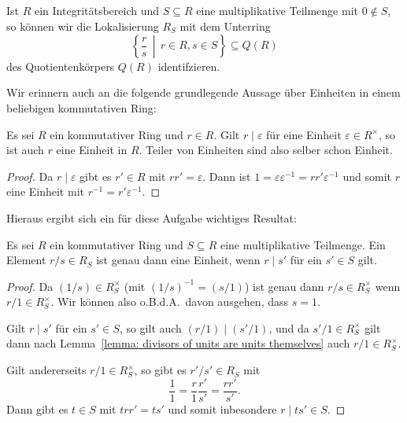 \documentclass[a4paper,10pt,numbers=noenddot]{scrartcl}
\begin{document}
\begin{remark}
  \label{remark: everythin lives in the quotient fields}
  Ist $R$ ein Integritätsbereich und $S \subseteq R$ eine multiplikative Teilmenge mit $0 \notin S$, so können wir die Lokalisierung $R_S$ mit dem Unterring
  \[
    \left\{ \frac{r}{s} \,\middle|\, r \in R, s \in S \right\}
    \subseteq Q(R)
  \]
  des Quotientenkörpers $Q(R)$ identifzieren.
\end{remark}

Wir erinnern auch an die folgende grundlegende Aussage über Einheiten in einem beliebigen kommutativen Ring:

\begin{lemma}
  \label{lemma: divisors of units are units themselves}
  Es sei $R$ ein kommutativer Ring und $r \in R$.
  Gilt $r \mid \varepsilon$ für eine Einheit $\varepsilon \in R^\times$, so ist auch $r$ eine Einheit in $R$.
  Teiler von Einheiten sind also selber schon Einheit.
\end{lemma}
\begin{proof}
  Da $r \mid \varepsilon$ gibt es $r' \in R$ mit $rr' = \varepsilon$.
  Dann ist $1 = \varepsilon \varepsilon^{-1} = r r' \varepsilon^{-1}$ und somit $r$ eine Einheit mit $r^{-1} = r' \varepsilon^{-1}$.
\end{proof}

Hieraus ergibt sich ein für diese Aufgabe wichtiges Resultat:

\begin{claim}
  \label{claim: divisors become units in the localization}
  Es sei $R$ ein kommutativer Ring und $S \subseteq R$ eine multiplikative Teilmenge.
  Ein Element $r/s \in R_S$ ist genau dann eine Einheit, wenn $r \mid s'$ für ein $s' \in S$ gilt.
\end{claim}
\begin{proof}
  Da $(1/s) \in R_S^{\times}$ (mit $(1/s)^{-1} = (s/1)$) ist genau dann $r/s \in R_S^\times$ wenn $r/1 \in R_S^\times$.
  Wir können also o.B.d.A.\ davon ausgehen, dass $s = 1$.
  
  Gilt $r \mid s'$ für ein $s' \in S$, so gilt auch $(r/1) \mid (s'/1)$, und da $s'/1 \in R_S^{\times}$ gilt dann nach Lemma~\ref{lemma: divisors of units are units themselves} auch $r/1 \in R_S^{\times}$.
  
  Gilt andererseits $r/1 \in R_S^\times$, so gibt es $r'/s' \in R_S$ mit
  \[
      \frac{1}{1}
    = \frac{r}{1} \frac{r'}{s'}
    = \frac{r r'}{s'}.
  \]
  Dann gibt es $t \in S$ mit $t r r' = t s'$ und somit inbesondere $r \mid t s' \in S$.
\end{proof}
\end{document}
